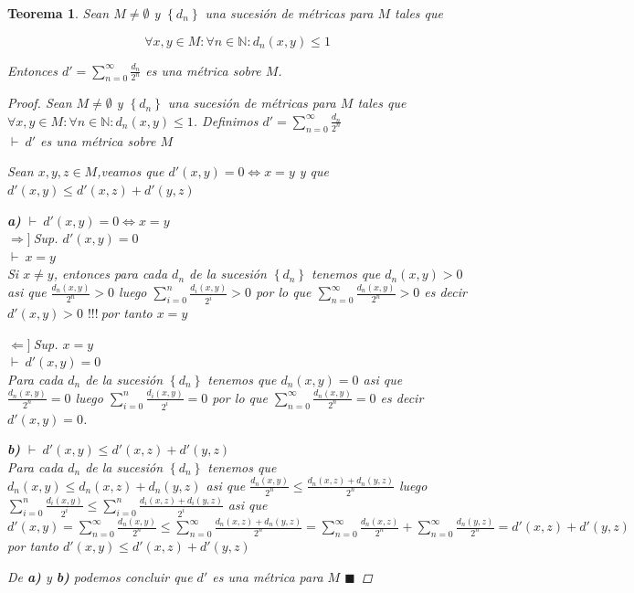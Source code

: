 \documentclass[oneside]{book} %
\theoremstyle{Teorema}
\newtheorem{Teorema}[Definicion]{Teorema}
\theoremstyle{Ejemplos}
\theoremstyle{[Obs]}
\renewcommand{\{}{\left\lbrace} %
\renewcommand{\}}{\right\rbrace} %
\renewcommand{\qed}{$\blacksquare$} %
\newcommand{\pd}{$\vdash\ $} %
\renewcommand{\c}{$!!!\ $} %
\newcommand{\necesidad}{$\Rightarrow]\ $} %
\newcommand{\suficiencia}{$\Leftarrow]\ $} %
\begin{document}
			\begin{Teorema}\setlength{\parindent}{0em}
				
				Sean $M \neq \emptyset$ y $\{ d_n \}$ una sucesión de métricas para $M$ tales que 

				\[ \forall x, y \in M : \forall n \in \mathbb{N} : d_n(x, y) \leq 1 \] 

				Entonces $d' = \displaystyle\sum_{n = 0}^{\infty} \frac{d_n}{2^n}$ es una métrica sobre $M$. 

				\begin{proof}
					
					Sean $M \neq \emptyset$ y $\{ d_n \}$ una sucesión de métricas para $M$ tales que $\forall x, y \in M : \forall n \in \mathbb{N} : d_n(x, y) \leq 1$. Definimos $d' = \sum_{n = 0}^{\infty} \frac{d_n}{2^n}$ \\
					\pd $d'$ es una métrica sobre $M$

					Sean $x, y, z \in M$,veamos que $d'(x, y) = 0 \Leftrightarrow x = y$ y que $d'(x, y) \leq d'(x, z) + d'(y, z)$ 

					\textbf{a)} \pd $d'(x, y) = 0 \Leftrightarrow x = y$ \\
					\necesidad Sup. $d'(x, y) = 0$ \\
					\pd $x = y$ \\
					Si $x \neq y$, entonces para cada $d_n$ de la sucesión $\{ d_n \}$ tenemos que $d_n(x, y) > 0$ asi que $\frac{d_n(x, y)}{2^n} > 0$ luego $\sum_{i = 0}^{n} \frac{d_i(x, y)}{2^i} > 0$ por lo que $\sum_{n = 0}^{\infty} \frac{d_n(x, y)}{2^n} > 0$ es decir $d'(x, y) > 0$ \c por tanto $x = y$

					\suficiencia Sup. $x = y$ \\
					\pd $d'(x, y) = 0$ \\
					Para cada $d_n$ de la sucesión $\{ d_n \}$ tenemos que $d_n(x, y) = 0$ asi que $\frac{d_n(x, y)}{2^n} = 0$ luego $\sum_{i = 0}^{n} \frac{d_i(x, y)}{2^i} = 0$ por lo que $\sum_{n = 0}^{\infty} \frac{d_n(x, y)}{2^n} = 0$ es decir $d'(x, y) = 0$.

					\textbf{b)} \pd $d'(x, y) \leq d'(x, z) + d'(y, z)$ \\
					Para cada $d_n$ de la sucesión $\{ d_n \}$ tenemos que $d_n(x, y) \leq d_n(x, z) + d_n(y, z)$ asi que $\frac{d_n(x, y)}{2^n} \leq \frac{d_n(x, z) + d_n(y, z)}{2^n}$ luego $\sum_{i = 0}^{n} \frac{d_i(x, y)}{2^i} \leq \sum_{i = 0}^{n} \frac{d_i(x, z) + d_i(y, z)}{2^i}$ asi que $d'(x, y) = \sum_{n = 0}^{\infty} \frac{d_n(x, y)}{2^n} \leq \sum_{n = 0}^{\infty} \frac{d_n(x, z) + d_n(y, z)}{2^n} = \sum_{n = 0}^{\infty} \frac{d_n(x, z)}{2^n} + \sum_{n = 0}^{\infty} \frac{d_n(y, z)}{2^n} = d'(x, z) + d'(y, z)$ por tanto $d'(x, y) \leq d'(x, z) + d'(y, z)$ 

					De \textbf{a)} y \textbf{b)} podemos concluir que $d'$ es una métrica para $M$ \qed


				\end{proof}

			\end{Teorema}
\end{document}
